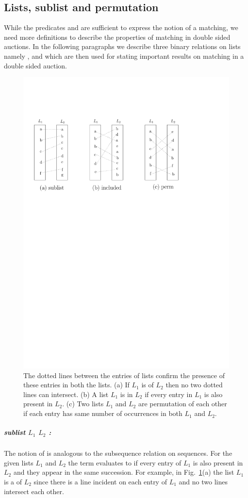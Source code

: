 \documentclass[a4paper,UKenglish,cleveref, autoref]{lipics-v2019}
\begin{document}
\subsection{Lists, sublist and permutation}
While the predicates  and    are sufficient to express the notion of a matching, we need more definitions to describe the properties of matching in double sided auctions.  In the following paragraphs we describe three binary relations on lists namely ,  and  which are then used for stating  important results on matching in a double sided auction. 

\begin{figure}[h!]
\centering
\includegraphics[width=.6\textwidth]{sub_inclu_perm.pdf}
\caption{The dotted lines between the entries of lists confirm the presence of these entries in both the lists. (a) If $L_1$ is  of $L_2$ then no two dotted lines can intersect. (b) A list $L_1$ is  in $L_2$ if every entry in $L_1$ is also present in $L_2$. (c) Two lists $L_1$ and $L_2$ are permutation of each other if each entry has same number of occurrences in both  $L_1$ and $L_2$. }
\label{fig:list}
\end{figure}

\subparagraph*{sublist $L_1$ $L_2$ :} The notion of   is analogous to the subsequence relation on sequences. For the given lists $L_1$ and $L_2$ the term   evaluates to   if every entry of $L_1$ is also present in $L_2$ and they appear in the same succession.  For example, in Fig.~\ref{fig:list}(a) the list $L_1$ is a  of $L_2$ since there is a line incident on each entry of $L_1$ and no two lines intersect each other. 
\end{document}
